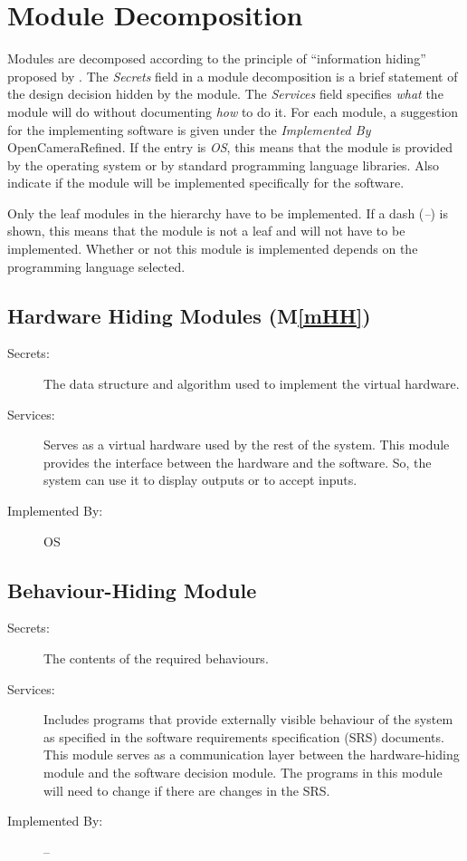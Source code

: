 \documentclass[12pt, titlepage]{article}
\newcommand{\mref}[1]{M\ref{#1}}
\begin{document}
\section{Module Decomposition} \label{SecMD}

Modules are decomposed according to the principle of ``information hiding''
proposed by \citet{ParnasEtAl1984}. The \emph{Secrets} field in a module
decomposition is a brief statement of the design decision hidden by the
module. The \emph{Services} field specifies \emph{what} the module will do
without documenting \emph{how} to do it. For each module, a suggestion for the
implementing software is given under the \emph{Implemented By} OpenCameraRefined. If the
entry is \emph{OS}, this means that the module is provided by the operating
system or by standard programming language libraries.  Also indicate if the
module will be implemented specifically for the software.

Only the leaf modules in the
hierarchy have to be implemented. If a dash (\emph{--}) is shown, this means
that the module is not a leaf and will not have to be implemented. Whether or
not this module is implemented depends on the programming language
selected.

\subsection{Hardware Hiding Modules (\mref{mHH})}

\begin{description}
\item[Secrets:]The data structure and algorithm used to implement the virtual
  hardware.
\item[Services:]Serves as a virtual hardware used by the rest of the
  system. This module provides the interface between the hardware and the
  software. So, the system can use it to display outputs or to accept inputs.
\item[Implemented By:] OS
\end{description}

\subsection{Behaviour-Hiding Module}

\begin{description}
\item[Secrets:]The contents of the required behaviours.
\item[Services:]Includes programs that provide externally visible behaviour of
  the system as specified in the software requirements specification (SRS)
  documents. This module serves as a communication layer between the
  hardware-hiding module and the software decision module. The programs in this
  module will need to change if there are changes in the SRS.
\item[Implemented By:] --
\end{description}
\end{document}
